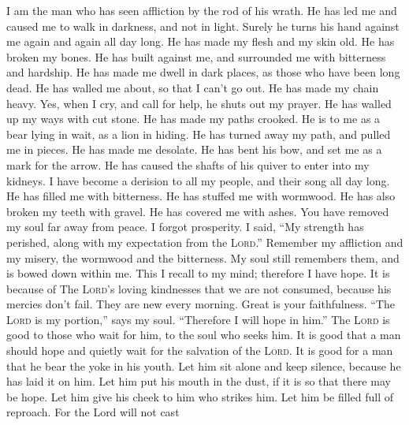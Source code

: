  I am the man who has seen affliction by the rod of his
wrath.  He has led me and caused me to walk in darkness,
and not in light.  Surely he turns his hand against me
again and again all day long.  He has made my flesh and my
skin old. He has broken my bones.  He has built against
me, and surrounded me with bitterness and hardship.  He
has made me dwell in dark places, as those who have been long dead.
 He has walled me about, so that I can't go out. He has
made my chain heavy.  Yes, when I cry, and call for help,
he shuts out my prayer.  He has walled up my ways with cut
stone. He has made my paths crooked.  He is to me as a
bear lying in wait, as a lion in hiding.  He has turned
away my path, and pulled me in pieces. He has made me desolate.
 He has bent his bow, and set me as a mark for the arrow.
 He has caused the shafts of his quiver to enter into my
kidneys.  I have become a derision to all my people, and
their song all day long.  He has filled me with
bitterness. He has stuffed me with wormwood.  He has also
broken my teeth with gravel. He has covered me with ashes.
 You have removed my soul far away from peace. I forgot
prosperity.  I said, ``My strength has perished, along
with my expectation from the \textsc{Lord}.''  Remember
my affliction and my misery, the wormwood and the bitterness.
 My soul still remembers them, and is bowed down within
me.  This I recall to my mind; therefore I have hope.
 It is because of The \textsc{Lord}'s loving kindnesses
that we are not consumed, because his mercies don't fail.
 They are new every morning. Great is your faithfulness.
 ``The \textsc{Lord} is my portion,'' says my soul.
``Therefore I will hope in him.''  The \textsc{Lord} is
good to those who wait for him, to the soul who seeks him.
 It is good that a man should hope and quietly wait for
the salvation of the \textsc{Lord}.  It is good for a man
that he bear the yoke in his youth.  Let him sit alone
and keep silence, because he has laid it on him.  Let him
put his mouth in the dust, if it is so that there may be hope.
 Let him give his cheek to him who strikes him. Let him
be filled full of reproach.  For the Lord will not cast
